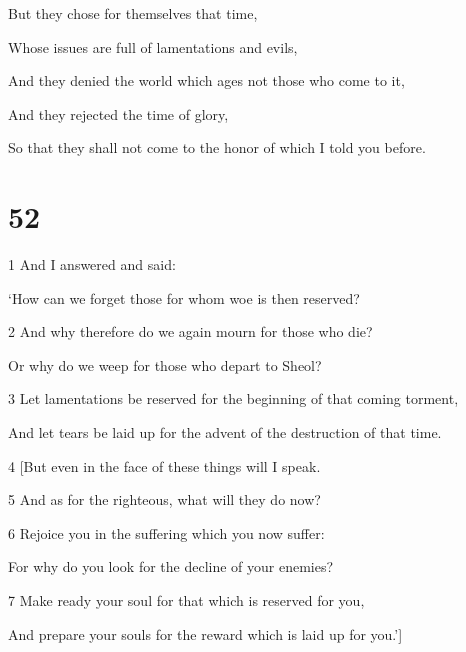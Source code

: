 \par But they chose for themselves that time,

\par Whose issues are full of lamentations and evils,

\par And they denied the world which ages not those who come to it,

\par And they rejected the time of glory,

\par So that they shall not come to the honor of which I told you before.

\chapter{52}

\par 1 And I answered and said:

\par ‘How can we forget those for whom woe is then reserved?

\par 2 And why therefore do we again mourn for those who die?

\par Or why do we weep for those who depart to Sheol?

\par 3 Let lamentations be reserved for the beginning of that coming torment,

\par And let tears be laid up for the advent of the destruction of that time.

\par 4 [But even in the face of these things will I speak.

\par 5 And as for the righteous, what will they do now?

\par 6 Rejoice you in the suffering which you now suffer:

\par For why do you look for the decline of your enemies?

\par 7 Make ready your soul for that which is reserved for you,

\par And prepare your souls for the reward which is laid up for you.’]

